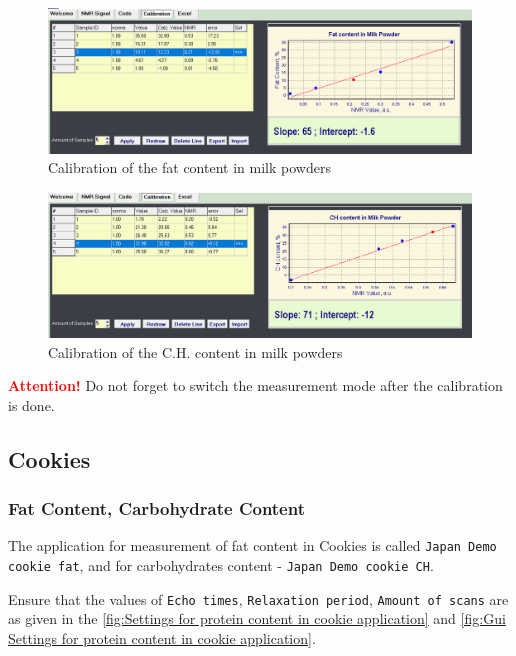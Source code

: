 \documentclass[a4paper,12pt]{article}
\begin{document}
\begin{figure}[H]
\centering
\includegraphics[width=17cm]{Calibration_Milk_Fat.png}
\caption{Calibration of the fat content in milk powders}
\label{fig:Calibration fat content in milk powders}
\end{figure}

\begin{figure}[H]
\centering
\includegraphics[width=17cm]{Calibration_Milk_CH.png}
\caption{Calibration of the C.H. content in milk powders}
\label{fig:Calibration CH content in milk powders}
\end{figure}

\textcolor{red}{\textbf{Attention!}} Do not forget to switch the measurement mode after the calibration is done.


\newpage
\subsection{Cookies}
\subsubsection{Fat Content, Carbohydrate Content}

The application for measurement of fat content in Cookies is called
\texttt{Japan Demo cookie fat},  and for carbohydrates content - \texttt{Japan Demo cookie CH}. 

Ensure that the values of \texttt{Echo times}, \texttt{Relaxation period}, \texttt{Amount of scans} are as given in the \cref{fig:Settings for protein content in cookie application} and \cref{fig:Gui Settings for protein content in cookie application}.
\end{document}
